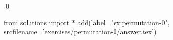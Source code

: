 
\begin{ex} 
  \label{ex:permutation-0}
  
  \qed
\end{ex} 
\begin{python0}
from solutions import *
add(label="ex:permutation-0",
    srcfilename='exercises/permutation-0/answer.tex') 
\end{python0}
